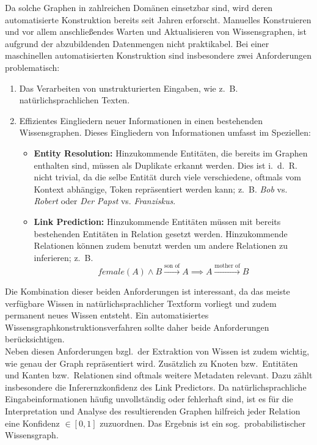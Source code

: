 \documentclass[11pt, a4paper]{scrreprt}
\begin{document}
Da solche Graphen in zahlreichen Domänen einsetzbar sind, wird deren automatisierte Konstruktion bereits seit Jahren erforscht.
Manuelles Konstruieren und vor allem anschließendes Warten und Aktualisieren von Wissensgraphen, ist aufgrund der abzubildenden Datenmengen nicht praktikabel.
Bei einer maschinellen automatisierten Konstruktion sind insbesondere zwei Anforderungen problematisch:
\begin{enumerate}
	\item Das Verarbeiten von unstrukturierten Eingaben, wie z.~B. natürlichsprachlichen Texten.
	\item Effizientes Eingliedern neuer Informationen in einen bestehenden Wissensgraphen.
		Dieses Eingliedern von Informationen umfasst im Speziellen:
		\begin{itemize}
			\item \textbf{Entity Resolution:}
				Hinzukommende Entitäten, die bereits im Graphen enthalten sind, müssen als Duplikate erkannt werden.
				Dies ist i.~d.~R. nicht trivial, da die selbe Entität durch viele verschiedene, oftmals vom Kontext abhängige, Token repräsentiert werden kann;
				z.~B. \textit{Bob} vs. \textit{Robert} oder \textit{Der Papst} vs. \textit{Franziskus}.
			\item \textbf{Link Prediction:}
				Hinzukommende Entitäten müssen mit bereits bestehenden Entitäten in Relation gesetzt werden.
				Hinzukommende Relationen können zudem benutzt werden um andere Relationen zu inferieren;
				z.~B. \[female(A) \land B \xrightarrow{\text{son~of}} A \implies A \xrightarrow{\text{mother~of}} B\]
		\end{itemize}
\end{enumerate}

Die Kombination dieser beiden Anforderungen ist interessant, da das meiste verfügbare Wissen in natürlichsprachlicher Textform vorliegt und zudem permanent neues Wissen entsteht.
Ein automatisiertes Wissensgraphkonstruktionsverfahren sollte daher beide Anforderungen berücksichtigen.\\

Neben diesen Anforderungen bzgl.\ der Extraktion von Wissen ist zudem wichtig, wie genau der Graph repräsentiert wird.
Zusätzlich zu Knoten bzw.\ Entitäten und Kanten bzw.\ Relationen sind oftmals weitere Metadaten relevant.
Dazu zählt insbesondere die Inferernzkonfidenz des Link Predictors.
Da natürlichsprachliche Eingabeinformationen häufig unvollständig oder fehlerhaft sind, ist es für die Interpretation und Analyse des resultierenden Graphen hilfreich jeder Relation eine Konfidenz \(\in [0, 1]\) zuzuordnen.
Das Ergebnis ist ein sog.\ probabilistischer Wissensgraph.
\end{document}
